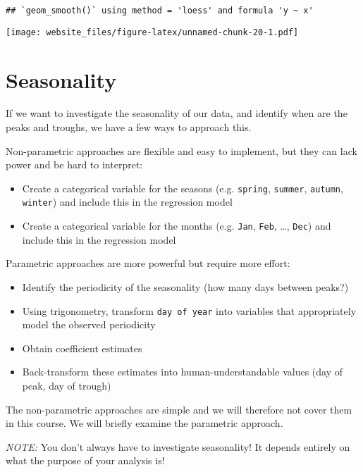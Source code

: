 \documentclass[]{book}
\providecommand{\tightlist}{%
  \setlength{\itemsep}{0pt}\setlength{\parskip}{0pt}}
\begin{document}
\begin{verbatim}
## `geom_smooth()` using method = 'loess' and formula 'y ~ x'
\end{verbatim}

\texttt{[image: website\_files/figure-latex/unnamed-chunk-20-1.pdf]}

\newpage

\section{Seasonality}\label{seasonality}

If we want to investigate the seasonality of our data, and identify when
are the peaks and troughs, we have a few ways to approach this.

Non-parametric approaches are flexible and easy to implement, but they
can lack power and be hard to interpret:

\begin{itemize}
\tightlist
\item
  Create a categorical variable for the seasons (e.g. \texttt{spring},
  \texttt{summer}, \texttt{autumn}, \texttt{winter}) and include this in
  the regression model
\item
  Create a categorical variable for the months (e.g. \texttt{Jan},
  \texttt{Feb}, \ldots{}, \texttt{Dec}) and include this in the
  regression model
\end{itemize}

Parametric approaches are more powerful but require more effort:

\begin{itemize}
\tightlist
\item
  Identify the periodicity of the seasonality (how many days between
  peaks?)
\item
  Using trigonometry, transform \texttt{day\ of\ year} into variables
  that appropriately model the observed periodicity
\item
  Obtain coefficient estimates
\item
  Back-transform these estimates into human-understandable values (day
  of peak, day of trough)
\end{itemize}

The non-parametric approaches are simple and we will therefore not cover
them in this course. We will briefly examine the parametric approach.

\emph{NOTE:} You don't always have to investigate seasonality! It
depends entirely on what the purpose of your analysis is!
\end{document}
